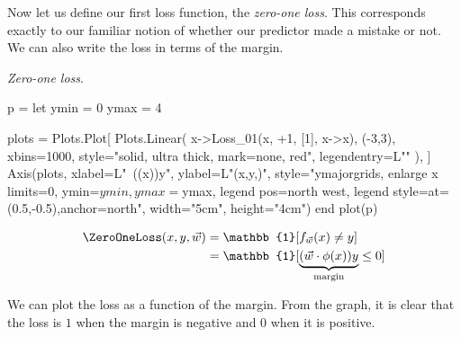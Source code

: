 
\pagebreak






Now let us define our first loss function, the \textit{zero-one loss}.
This corresponds exactly to our familiar notion of whether our predictor made a mistake or not.
We can also write the loss in terms of the margin.
\begin{marginfigure}
    \caption{
        \label{fig:zero_one_loss} \textit{Zero-one loss}.
    }
  \begin{jlcode}
  p = let
      ymin = 0
      ymax = 4

      plots = Plots.Plot[
          Plots.Linear(
              x->Loss_01(x, +1, [1], x->x), (-3,3), xbins=1000, style="solid, ultra thick, mark=none, red", legendentry=L"\ZeroOneLoss"
          ),
      ]
      Axis(plots,
           xlabel=L"~(\cdot\phi(x))y",
           ylabel=L"\ZeroOneLoss(x,y,)",
           style="ymajorgrids, enlarge x limits=0, ymin=$ymin, ymax=$ymax, legend pos=north west, legend style={at={(0.5,-0.5)},anchor=north}",
           width="5cm", height="4cm")
  end
  plot(p)
  \end{jlcode}
  \begin{center}
  \end{center}
\end{marginfigure}
\begin{align*}
\ZeroOneLoss(x, y, \vec{w}) &= \mathbb{1}[f_{\vec{w}}(x) \neq y]\\
                            &= \mathbb{1}[\underbrace{(\vec{w} \cdot \phi(x)) y}_\text{margin} \le 0]
\end{align*}

We can plot the loss as a function of the margin.
From the graph, it is clear that the loss is $1$ when the margin is negative and $0$ when it is positive.

